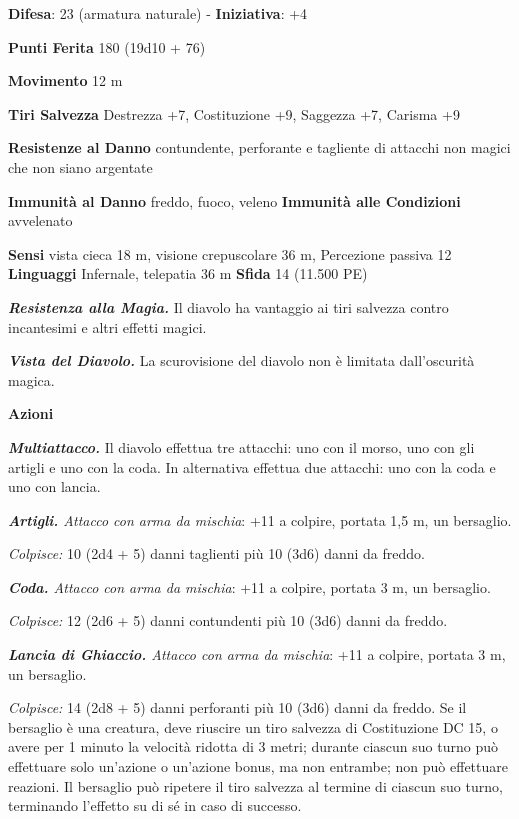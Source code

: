 \begin{multicols}{2}
\textbf{Difesa}: 23 (armatura naturale) - \textbf{Iniziativa}: +4

\textbf{Punti Ferita} 180 (19d10 + 76)

\textbf{Movimento} 12 m

\textbf{Tiri Salvezza} Destrezza +7, Costituzione +9, Saggezza +7,
Carisma +9

\textbf{Resistenze al Danno} contundente, perforante e tagliente di
attacchi non magici che non siano argentate

\textbf{Immunità al Danno} freddo, fuoco, veleno \textbf{Immunità alle
Condizioni} avvelenato

\textbf{Sensi} vista cieca 18 m, visione crepuscolare 36 m, Percezione passiva
12 \textbf{Linguaggi} Infernale, telepatia 36 m \textbf{Sfida} 14
(11.500 PE)

\emph{\textbf{Resistenza alla Magia.}} Il diavolo ha vantaggio ai tiri
salvezza contro incantesimi e altri effetti magici.

\emph{\textbf{Vista del Diavolo.}} La scurovisione del diavolo non è
limitata dall'oscurità magica.

\textbf{Azioni}

\emph{\textbf{Multiattacco.}} Il diavolo effettua tre attacchi: uno con
il morso, uno con gli artigli e uno con la coda. In alternativa effettua
due attacchi: uno con la coda e uno con lancia.

\emph{\textbf{Artigli.} Attacco con arma da mischia}: +11 a colpire,
portata 1,5 m, un bersaglio.

\emph{Colpisce:} 10 (2d4 + 5) danni taglienti più 10 (3d6) danni da
freddo.

\emph{\textbf{Coda.} Attacco con arma da mischia}: +11 a colpire,
portata 3 m, un bersaglio.

\emph{Colpisce:} 12 (2d6 + 5) danni contundenti più 10 (3d6) danni da
freddo.

\emph{\textbf{Lancia di Ghiaccio.} Attacco con arma da mischia}: +11 a
colpire, portata 3 m, un bersaglio.

\emph{Colpisce:} 14 (2d8 + 5) danni perforanti più 10 (3d6) danni da
freddo. Se il bersaglio è una creatura, deve riuscire un tiro salvezza
di Costituzione DC 15, o avere per 1 minuto la velocità ridotta di 3
metri; durante ciascun suo turno può effettuare solo un'azione o
un'azione bonus, ma non entrambe; non può effettuare reazioni. Il
bersaglio può ripetere il tiro salvezza al termine di ciascun suo turno,
terminando l'effetto su di sé in caso di successo.


\end{multicols}
